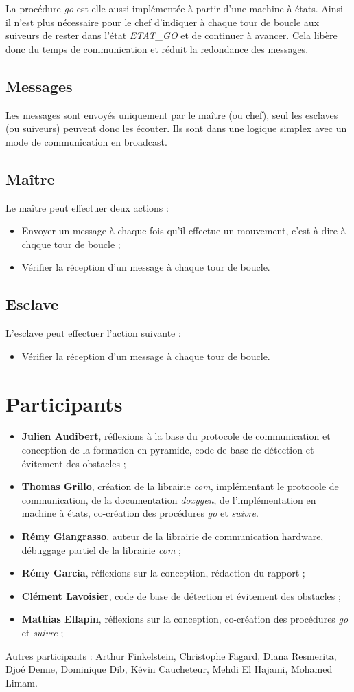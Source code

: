 \documentclass[a4paper,12pt]{article}
\begin{document}
La procédure \textit{go} est elle aussi implémentée à partir d'une machine à états. Ainsi il n'est plus nécessaire pour le chef d'indiquer à chaque tour de boucle aux suiveurs de rester dans l'état \textit{ETAT\_GO} et de continuer à avancer. Cela libère donc du temps de communication et réduit la redondance des messages.

\subsection{Messages}
Les messages sont envoyés uniquement par le maître (ou chef), seul les esclaves (ou suiveurs) peuvent donc les écouter. Ils sont dans une logique simplex avec un mode de communication en broadcast.

\subsection{Maître}
Le maître peut effectuer deux actions :
\begin{itemize}
        \item Envoyer un message à chaque fois qu'il effectue un mouvement, c'est-à-dire à chqque tour de boucle ;
        \item Vérifier la réception d'un message à chaque tour de boucle.
\end{itemize}

\subsection{Esclave}
L'esclave peut effectuer l'action suivante :
\begin{itemize}
        \item Vérifier la réception d'un message à chaque tour de boucle.
\end{itemize}

\section{Participants}
\begin{itemize}
        \item \textbf{Julien Audibert}, réflexions à la base du protocole de communication et conception de la formation en pyramide, code de base de détection et évitement des obstacles ;
        \item \textbf{Thomas Grillo}, création de la librairie \textit{com}, implémentant le protocole de communication, de la documentation \textit{doxygen}, de l'implémentation en machine à états, co-création des procédures \textit{go} et \textit{suivre}.
        \item \textbf{Rémy Giangrasso}, auteur de la librairie de communication hardware, débuggage partiel de la librairie \textit{com} ;
        \item \textbf{Rémy Garcia}, réflexions sur la conception, rédaction du rapport ;
        \item \textbf{Clément Lavoisier}, code de base de détection et évitement des obstacles ;
        \item \textbf{Mathias Ellapin}, réflexions sur la conception, co-création des procédures \textit{go} et \textit{suivre} ;
\end{itemize}

Autres participants : Arthur Finkelstein, Christophe Fagard, Diana Resmerita, Djoé Denne, Dominique Dib, Kévin Caucheteur, Mehdi El Hajami, Mohamed Limam.
\end{document}
